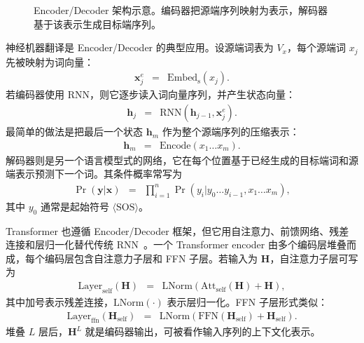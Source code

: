 \begin{figure}[htbp]
  \centering
  
  \caption{Encoder/Decoder 架构示意。编码器把源端序列映射为表示，解码器基于该表示生成目标端序列。}
  \label{fig:nlpbook-encoder-decoder}
\end{figure}

神经机器翻译是 Encoder/Decoder 的典型应用。设源端词表为 $V_x$，每个源端词 $x_j$ 先被映射为词向量：
\begin{eqnarray}
\mathbf{x}_j^{e}
& = &
\mathrm{Embed}_{\mathrm{s}}(x_j).
\end{eqnarray}
若编码器使用 RNN，则它逐步读入词向量序列，并产生状态向量：
\begin{eqnarray}
\mathbf{h}_j
& = &
\mathrm{RNN}(\mathbf{h}_{j-1},\mathbf{x}_j^{e}).
\end{eqnarray}
最简单的做法是把最后一个状态 $\mathbf{h}_m$ 作为整个源端序列的压缩表示：
\begin{eqnarray}
\mathbf{h}_m
& = &
\mathrm{Encode}(x_1\ldots x_m).
\end{eqnarray}
解码器则是另一个语言模型式的网络，它在每个位置基于已经生成的目标端词和源端表示预测下一个词。其条件概率常写为
\begin{eqnarray}
\Pr(\mathbf{y}|\mathbf{x})
& = &
\prod_{i=1}^{n}
\Pr(y_i|y_0\ldots y_{i-1},x_1\ldots x_m),
\end{eqnarray}
\noindent 其中 $y_0$ 通常是起始符号 $\langle \mathrm{SOS} \rangle$。

Transformer 也遵循 Encoder/Decoder 框架，但它用自注意力、前馈网络、残差连接和层归一化替代传统 RNN~\cite{HeEtAl2016ResNet,BaEtAl2016LayerNorm,VaswaniEtAl2017Transformer}。一个 Transformer encoder 由多个编码层堆叠而成，每个编码层包含自注意力子层和 FFN 子层。若输入为 $\mathbf{H}$，自注意力子层可写为
\begin{eqnarray}
\mathrm{Layer}_{\mathrm{self}}(\mathbf{H})
& = &
\mathrm{LNorm}
(
\mathrm{Att}_{\mathrm{self}}(\mathbf{H})+\mathbf{H}
),
\end{eqnarray}
\noindent 其中加号表示残差连接，$\mathrm{LNorm}(\cdot)$ 表示层归一化。FFN 子层形式类似：
\begin{eqnarray}
\mathrm{Layer}_{\mathrm{ffn}}(\mathbf{H}_{\mathrm{self}})
& = &
\mathrm{LNorm}
(
\mathrm{FFN}(\mathbf{H}_{\mathrm{self}})
+\mathbf{H}_{\mathrm{self}}
).
\end{eqnarray}
堆叠 $L$ 层后，$\mathbf{H}^{L}$ 就是编码器输出，可被看作输入序列的上下文化表示。

